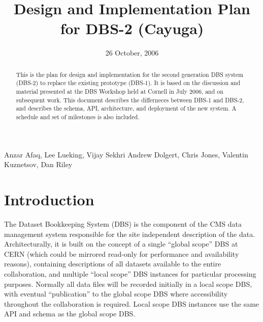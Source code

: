 \documentclass{cmspaper}
\begin{document}

\begin{titlepage}

   \date{26 October, 2006}

  \title{Design and Implementation Plan for DBS-2 (Cayuga)}

  \begin{Authlist}
  Anzar Afaq,  Lee Lueking,  Vijay Sekhri     
Andrew Dolgert,  Chris Jones,  Valentin Kuznetsov, Dan Riley

  \end{Authlist}



  \begin{abstract}
    This is the plan for design and implementation for the second generation DBS system (DBS-2) to replace the existing prototype (DBS-1). It is based on the discussion and material presented at the DBS Workshop held at Cornell in July 2006, and on subsequent work. This document describes the differneces between DBS-1 and DBS-2, and describes the schema, API, architecture, and deployment of the new system. A schedule and set of milestones is also included.
 
  \end{abstract} 
  
\end{titlepage}

\setcounter{page}{2}%


%

\section{Introduction}

The Dataset Bookkeeping System (DBS) is the component of the CMS data
management system responsible for the site independent description of
the data.  Architecturally, it is built on the concept of a single
``global scope'' DBS at CERN (which could be mirrored read-only for
performance and availability reasons), containing descriptions of all
datasets available to the entire collaboration, and multiple ``local
scope'' DBS instances for particular processing purposes.  Normally
all data files will be recorded initially in a local scope DBS, with
eventual ``publication'' to the global scope DBS where accessibility
throughout the collaboration is required.  Local scope DBS instances
use the same API and schema as the global scope DBS.
\end{document}
